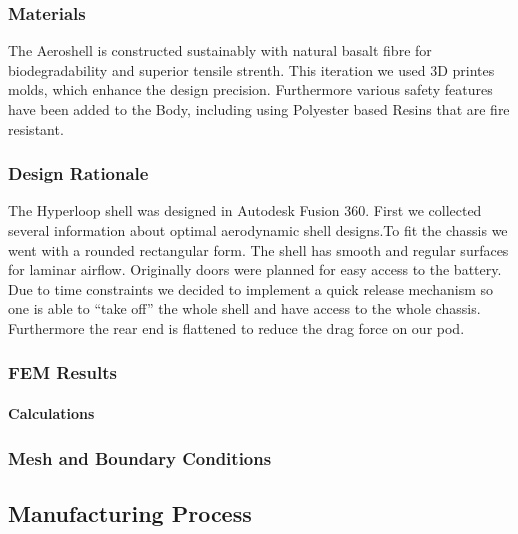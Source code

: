 \subsubsection{Materials}


The Aeroshell is constructed sustainably with natural basalt fibre for biodegradability and superior tensile strenth. This iteration we used 3D printes molds, which enhance the design precision. Furthermore various safety features have been added to the Body, including using Polyester based Resins that are fire resistant.
\par %

\subsubsection{Design Rationale}


The Hyperloop shell was designed in Autodesk Fusion 360. First we collected several information about optimal aerodynamic shell designs.To fit the chassis we went with a rounded rectangular form. The shell has smooth and regular surfaces for laminar airflow. Originally doors were planned for easy access to the battery. Due to time constraints we decided to implement a quick release mechanism so one is able to “take off” the whole shell and have access to the whole chassis. Furthermore the rear end is flattened to reduce the drag force on our pod.
\par %


\subsubsection{FEM Results}

\paragraph{Calculations}

\subsubsection{Mesh and Boundary Conditions}



\subsection{Manufacturing Process}



\par %

